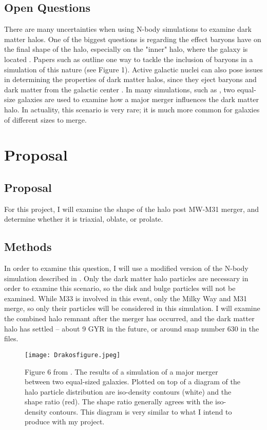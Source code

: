 \documentclass[linenumbers,trackchanges]{aastex7}
\begin{document}
\subsection{Open Questions}
There are many uncertainties when using N-body simulations to examine dark matter halos. One of the biggest questions is regarding the effect baryons have on the final shape of the halo, especially on the "inner" halo, where the galaxy is located \citep{Chua2019}. Papers such as \cite{Abadi2010} outline one way to tackle the inclusion of baryons in a simulation of this nature (see Figure 1). Active galactic nuclei can also pose issues in determining the properties of dark matter halos, since they eject baryons and dark matter from the galactic center \citep{Chua2019}. In many simulations, such as \cite{Drakos2019}, two equal-size galaxies are used to examine how a major merger influences the dark matter halo. In actuality, this scenario is very rare; it is much more common for galaxies of different sizes to merge. 



\section{Proposal}

\subsection{Proposal}
For this project, I will examine the shape of the halo post MW-M31 merger, and determine whether it is triaxial, oblate, or prolate. 

\subsection{Methods}
In order to examine this question, I will use a modified version of the N-body simulation described in \cite{vanderMarel_2012}. Only the dark matter halo particles are necessary in order to examine this scenario, so the disk and bulge particles will not be examined. While M33 is involved in this event, only the Milky Way and M31 merge, so only their particles will be considered in this simulation. I will examine the combined halo remnant after the merger has occurred, and the dark matter halo has settled -- about 9 GYR in the future, or around snap number 630 in the files.

 \begin{figure}[h!]
    \centering
    \texttt{[image: Drakosfigure.jpeg]}
    \caption{Figure 6 from \cite{Drakos2019}. The results of a simulation of a major merger between two equal-sized galaxies. Plotted on top of a diagram of the halo particle distribution are iso-density contours (white) and the shape ratio (red). The shape ratio generally agrees with the iso-density contours. This diagram is very similar to what I intend to produce with my project.}
    \label{fig:enter-label}
\end{figure}
\end{document}
